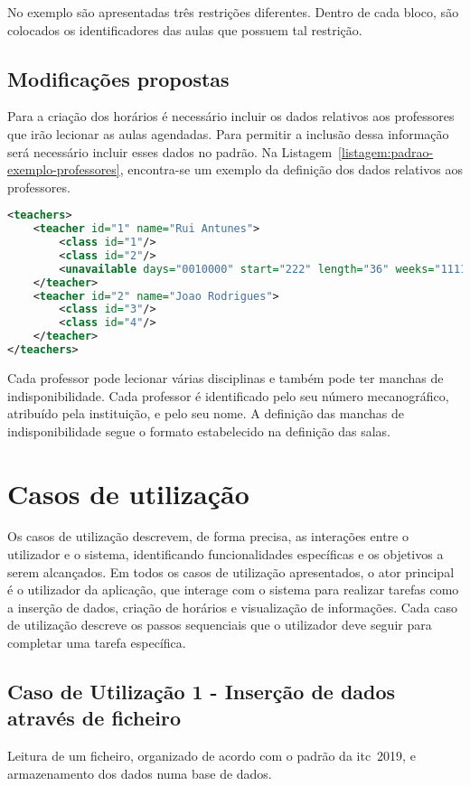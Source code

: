 No exemplo são apresentadas três restrições diferentes. Dentro de cada bloco, são colocados os identificadores das aulas que possuem tal restrição.

\subsection{Modificações propostas}

Para a criação dos horários é necessário incluir os dados relativos aos professores que irão lecionar as aulas agendadas. Para permitir a inclusão dessa informação será necessário incluir esses dados no padrão. Na Listagem~\ref{listagem:padrao-exemplo-professores}, encontra-se um exemplo da definição dos dados relativos aos professores.

\begin{lstlisting}[language=XML, float, caption={Exemplo da informação relacionada com os professores.}, label={listagem:padrao-exemplo-professores}]
<teachers>
    <teacher id="1" name="Rui Antunes">
        <class id="1"/>
        <class id="2"/>
        <unavailable days="0010000" start="222" length="36" weeks="111111111111111"/>
    </teacher>
    <teacher id="2" name="Joao Rodrigues">
        <class id="3"/>
        <class id="4"/>
    </teacher>
</teachers>
\end{lstlisting}

Cada professor pode lecionar várias disciplinas e também pode ter manchas de indisponibilidade. Cada professor é identificado pelo seu número mecanográfico, atribuído pela instituição, e pelo seu nome. A definição das manchas de indisponibilidade segue o formato estabelecido na definição das salas.

\section{Casos de utilização}
\label{capitulo3:Casos-util}

Os casos de utilização descrevem, de forma precisa, as interações entre o utilizador e o sistema, identificando funcionalidades específicas e os objetivos a serem alcançados. Em todos os casos de utilização apresentados, o ator principal é o utilizador da aplicação, que interage com o sistema para realizar tarefas como a inserção de dados, criação de horários e visualização de informações. Cada caso de utilização descreve os passos sequenciais que o utilizador deve seguir para completar uma tarefa específica.

\subsection*{Caso de Utilização 1 - Inserção de dados através de ficheiro}
Leitura de um ficheiro, organizado de acordo com o padrão da \gls{itc}~2019, e armazenamento dos dados numa base de dados.

